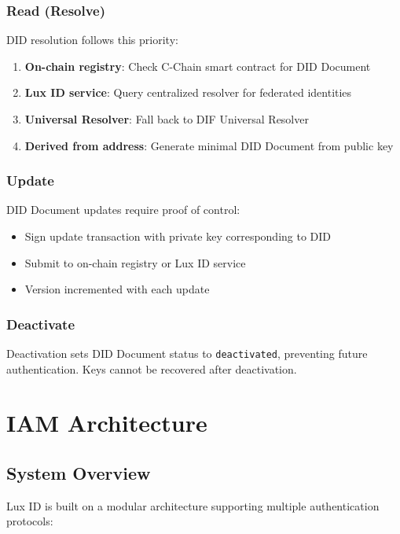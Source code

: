 \documentclass[11pt,a4paper]{article}
\begin{document}
\subsubsection{Read (Resolve)}

DID resolution follows this priority:
\begin{enumerate}
  \item \textbf{On-chain registry}: Check C-Chain smart contract for DID Document
  \item \textbf{Lux ID service}: Query centralized resolver for federated identities
  \item \textbf{Universal Resolver}: Fall back to DIF Universal Resolver \cite{universal-resolver}
  \item \textbf{Derived from address}: Generate minimal DID Document from public key
\end{enumerate}

\subsubsection{Update}

DID Document updates require proof of control:
\begin{itemize}
  \item Sign update transaction with private key corresponding to DID
  \item Submit to on-chain registry or Lux ID service
  \item Version incremented with each update
\end{itemize}

\subsubsection{Deactivate}

Deactivation sets DID Document status to \texttt{deactivated}, preventing future authentication. Keys cannot be recovered after deactivation.

\section{IAM Architecture}

\subsection{System Overview}

Lux ID is built on a modular architecture supporting multiple authentication protocols:
\end{document}
